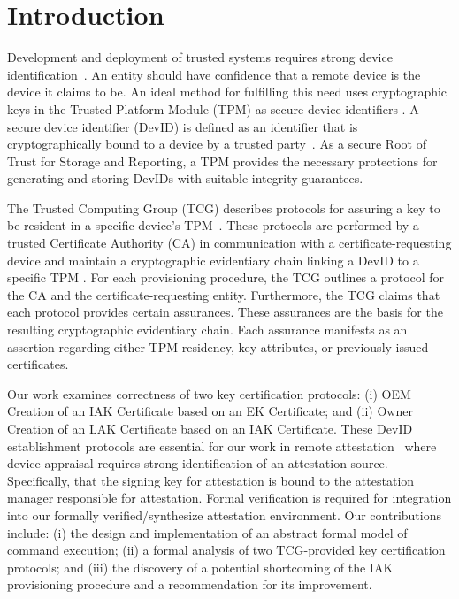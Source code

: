 \documentclass[runningheads]{llncs}
\begin{document}
\section{Introduction}
Development and deployment of trusted systems requires strong device
identification~\citep{Martin:08:The-ten-page-in}. An entity should
have confidence that a remote device is the device it claims to be. An
ideal method for fulfilling this need uses cryptographic keys in the
Trusted Platform Module (TPM) as secure device identifiers
\citep{DevIDSpec-TCG}. A secure device identifier (DevID) is defined
as an identifier that is cryptographically bound to a device by a
trusted party~\citep{DevIDSpec-IEEE}.  As a secure Root of Trust for
Storage and Reporting, a TPM provides the necessary
protections for generating and storing DevIDs with suitable integrity
guarantees.

The Trusted Computing Group (TCG) describes protocols for assuring a
key to be resident in a specific device's
TPM~\citep{DevIDSpec-TCG}. These protocols are performed by a trusted
Certificate Authority (CA) in communication with a
certificate-requesting device and maintain a cryptographic evidentiary
chain linking a DevID to a specific TPM \citep{DevIDSpec-TCG}.  For
each provisioning procedure, the TCG outlines a protocol for the CA
and the certificate-requesting entity. Furthermore, the TCG claims
that each protocol provides certain assurances. These assurances are
the basis for the resulting cryptographic evidentiary chain.  Each
assurance manifests as an assertion regarding either TPM-residency,
key attributes, or previously-issued certificates.

Our work examines correctness of two key certification protocols: (i)
OEM Creation of an IAK Certificate based on an EK Certificate; and
(ii) Owner Creation of an LAK Certificate based on an IAK
Certificate. These DevID establishment protocols are essential for our
work in remote
attestation~\cite{Coker::Principles-of-R,petz2022innovations} where
device appraisal requires strong identification of an attestation
source. Specifically, that the signing key for attestation is bound to
the attestation manager responsible for attestation.  Formal
verification is required for integration into our formally
verified/synthesize attestation
environment\citep{petz2022innovations}.  Our contributions include:
(i) the design and implementation of an abstract formal model of
command execution; (ii) a formal analysis of two TCG-provided key
certification protocols; and (iii) the discovery of a potential
shortcoming of the IAK provisioning procedure and a recommendation for
its improvement.
\end{document}
